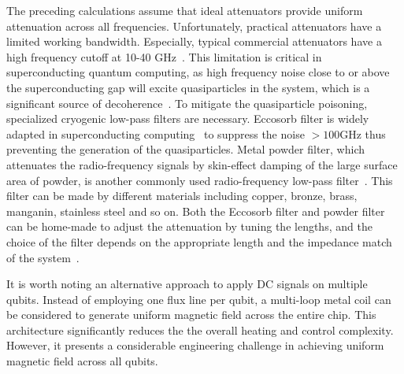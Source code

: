 \documentclass[a4paper,onecolumn,11pt,unpublished]{quantumarticle}
\begin{document}
The preceding calculations assume that ideal attenuators provide uniform attenuation across all frequencies. Unfortunately, practical attenuators have a limited working bandwidth. Especially, typical commercial attenuators have a high frequency cutoff at 10-40 GHz~\cite{Nguyen2020Toward}. This limitation is critical in superconducting quantum computing, as high frequency noise close to or above the superconducting gap will excite quasiparticles in the system, which is a significant source of decoherence~\cite{Catelani2011Quasiparticle,Barends2011Minimizing,Corcoles2011Protecting,Pop2014Coherent,McEwen2022Resolving,Vepsalainen2020Impact,Martinis2021Saving,Serniak2018Hot,Kreikebaum2016Optimization}. To mitigate the quasiparticle poisoning, specialized cryogenic low-pass filters are necessary. Eccosorb filter is widely adapted in superconducting computing~\cite{Peterer2012Investigating,Nguyen2020Toward,Krinner2019Engineering,Bao2022Fluxonium} to suppress the noise $>100 \text{GHz}$ thus preventing the generation of the quasiparticles. Metal powder filter, which attenuates the radio-frequency signals by skin-effect damping of the large surface area of powder, is another commonly used radio-frequency low-pass filter~\cite{Martinis1987Experimental,Fukushima1997Attenuation,Lukashenko2008Improved,Baselmans2009Long,Barends2011Minimizing,Masluk2012Reducing,Geerlings2013Improving}. This filter can be made by different materials including copper, bronze, brass, manganin, stainless steel and so on. Both the Eccosorb filter and powder filter can be home-made to adjust the attenuation by tuning the lengths, and the choice of the filter depends on the appropriate length and the impedance match of the system~\cite{Geerlings2013Improving}.

It is worth noting an alternative approach to apply DC signals on multiple qubits. Instead of employing one flux line per qubit, a multi-loop metal coil can be considered to generate uniform magnetic field across the entire chip. This architecture significantly reduces the the overall heating and control complexity. However, it presents a considerable engineering challenge in achieving uniform magnetic field across all qubits.
\end{document}
